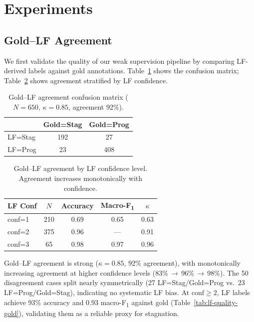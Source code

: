 \documentclass[11pt,a4paper]{article}
\newcommand{\fone}{F\textsubscript{1}}
\begin{document}
\section{Experiments}
\label{sec:experiments}

\subsection{Gold--LF Agreement}
\label{sec:gold-lf-agreement}

We first validate the quality of our weak supervision pipeline by comparing LF-derived labels against gold annotations. Table~\ref{tab:gold-lf-confusion} shows the confusion matrix; Table~\ref{tab:gold-lf-confidence} shows agreement stratified by LF confidence.

\begin{table}[t]
\centering
\small
\begin{tabular}{lcc}
\toprule
 & Gold=Stag & Gold=Prog \\
\midrule
LF=Stag & 192 & 27 \\
LF=Prog & 23 & 408 \\
\bottomrule
\end{tabular}
\caption{Gold--LF agreement confusion matrix ($N{=}650$, $\kappa{=}0.85$, agreement 92\%).}
\label{tab:gold-lf-confusion}
\end{table}

\begin{table}[t]
\centering
\small
\begin{tabular}{lcccc}
\toprule
LF Conf & $N$ & Accuracy & Macro-\fone{} & $\kappa$ \\
\midrule
conf=1 & 210 & 0.69 & 0.65 & 0.63 \\
conf=2 & 375 & 0.96 & --- & 0.91 \\
conf=3 & 65 & 0.98 & 0.97 & 0.96 \\
\bottomrule
\end{tabular}
\caption{Gold--LF agreement by LF confidence level. Agreement increases monotonically with confidence.}
\label{tab:gold-lf-confidence}
\end{table}

Gold--LF agreement is strong ($\kappa{=}0.85$, 92\% agreement), with monotonically increasing agreement at higher confidence levels (83\%$\,{\to}\,$96\%$\,{\to}\,$98\%).
The 50 disagreement cases split nearly symmetrically (27 LF=Stag/Gold=Prog vs.\ 23 LF=Prog/Gold=Stag), indicating no systematic LF bias. At $\text{conf}{\geq}2$, LF labels achieve 93\% accuracy and 0.93 macro-\fone{} against gold (Table~\ref{tab:lf-quality-gold}), validating them as a reliable proxy for stagnation.
\end{document}
